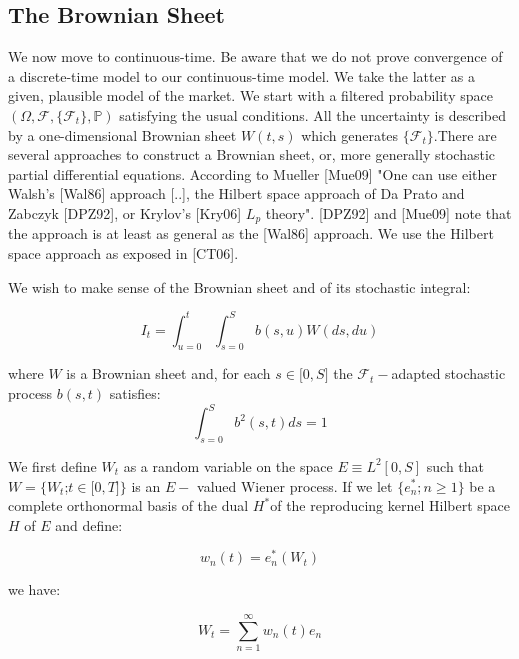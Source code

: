 \documentclass{article}
\begin{document}
\bigskip

\subsection{The Brownian Sheet}

We now move to continuous-time. Be aware that we do not prove convergence of
a discrete-time model to our continuous-time model. We take the latter as a
given, plausible model of the market. We start with a filtered probability
space $(\Omega ,\mathcal{F},\{\mathcal{F}_{t}\},\mathbb{P})$ satisfying the
usual conditions. All the uncertainty is described by a one-dimensional
Brownian sheet $W(t,s)$ which generates $\{\mathcal{F}_{t}\}$.There are
several approaches to construct a Brownian sheet, or, more generally
stochastic partial differential equations. According to Mueller [Mue09] "One
can use either Walsh's [Wal86] approach [..], the Hilbert space approach of
Da Prato and Zabczyk [DPZ92], or Krylov's [Kry06] $L_{p}$ theory". [DPZ92]
and [Mue09] note that the approach is at least as general as the [Wal86]
approach. We use the Hilbert space approach as exposed in [CT06].

\bigskip

We wish to make sense of the Brownian sheet and of its stochastic integral:

\begin{equation}
I_{t}=\int_{u=0}^{t}\int_{s=0}^{S}b(s,u)W(ds,du)  \label{continuous}
\end{equation}%
\bigskip

where $W$ is a Brownian sheet and, for each $s\in \lbrack 0,S]$ the $%
\mathcal{F}_{t}-$adapted stochastic process $b(s,t)$ satisfies:%
\begin{equation*}
\int_{s=0}^{S}b^{2}(s,t)ds=1
\end{equation*}

We first define $W_{t}$ as a random variable on the space $E\equiv
L^{2}[0,S] $ such that $W=\{W_{t}$;$t\in \lbrack 0,T]\}$ is an $E-$ valued
Wiener process. If we let $\{e_{n}^{\ast };n\geq 1\}$ be a complete
orthonormal basis of the dual $H^{\ast }$of the reproducing kernel Hilbert
space $H$ of $E$ and define:

\begin{equation*}
w_{n}(t)=e_{n}^{\ast }(W_{t})
\end{equation*}

we have:

\begin{equation}
W_{t}=\sum_{n=1}^{\infty }w_{n}(t)e_{n}  \label{nonconvergent}
\end{equation}
\end{document}
